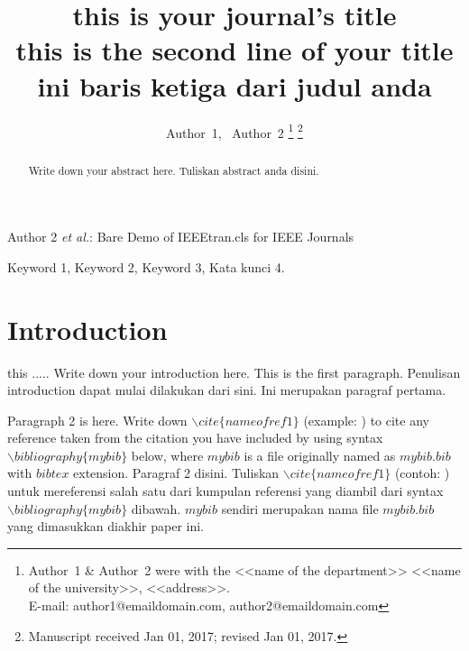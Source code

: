 \documentclass[journal]{IEEEtran}
\begin{document}
\title{
	this is your journal's title \\ %
	this is the second line of your title \\
	ini baris ketiga dari judul anda
}

\author{Author~1,~
        Author~2%
\thanks{Author~1 \& Author~2 were with the <<name of the department>> <<name of the university>>, <<address>>. \protect\\
E-mail: author1@emaildomain.com, author2@emaildomain.com}%
\thanks{Manuscript received Jan 01, 2017; revised Jan 01, 2017.}}

%
{Author 2 \MakeLowercase{\textit{et al.}}: Bare Demo of IEEEtran.cls for IEEE Journals}

\maketitle

\begin{abstract}
Write down your abstract here. Tuliskan abstract anda disini.

\end{abstract}

\begin{IEEEkeywords}
Keyword 1, Keyword 2, Keyword 3, Kata kunci 4. %
\end{IEEEkeywords}

\IEEEpeerreviewmaketitle

\section{Introduction}

 this ..... Write down your introduction here. This is the first paragraph. Penulisan introduction dapat mulai dilakukan dari sini. Ini merupakan paragraf pertama.

\vfill
Paragraph 2 is here. Write down $\backslash cite\{nameofref1\}$ (example: \cite{nameofref1}) to cite any reference taken from the citation you have included by using syntax $\backslash bibliography\{mybib\}$ below, where $mybib$ is a file originally named as $mybib.bib$ with $bibtex$ extension. Paragraf 2 disini. Tuliskan $\backslash cite\{nameofref1\}$ (contoh: \cite{nameofref1}) untuk mereferensi salah satu dari kumpulan referensi yang diambil dari syntax $\backslash bibliography\{mybib\}$ dibawah. $mybib$ sendiri merupakan nama file $mybib.bib$ yang dimasukkan diakhir paper ini. 
\end{document}
